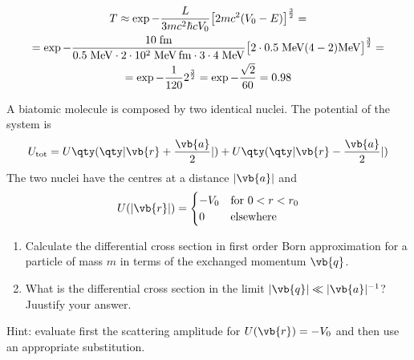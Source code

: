\begin{soluzione}
   \begin{gather*}
      T
      \approx \exp{ - \frac{L}{3 mc^2 \hbar c V_0} \bigl[ 2 mc^2 (V_0 - E) \bigr]^{\frac{3}{2}} }
      =\\
      =\rm \exp{ - \frac{10 \; fm}{0.5 \; MeV \cdot 2 \cdot 10^2 \; MeV \, fm \cdot 3 \cdot 4 \; MeV} \bigl[ 2 \cdot 0.5 \; MeV (4 - 2) MeV \bigr]^{\frac{3}{2}} }
      =\\
      =\exp{ -\frac{1}{120} 2^{\frac{3}{2}} }
      =\exp{-\frac{\sqrt{2}}{60}}
      =0.98
   \end{gather*}
\end{soluzione}

\newpage
\setcounter{equation}{0}

\begin{esercizio}
   A biatomic molecule is composed by two identical nuclei. The potential of the system is
   \begin{equation*}
      U_{\rm tot}=U\qty( \qty| \vb{r} + \frac{\vb{a}}{2} | ) + U\qty( \qty| \vb{r} - \frac{\vb{a}}{2} | )
   \end{equation*}
   The two nuclei have the centres at a distance $|\vb{a}|$ and
   \begin{equation*}
      U(|\vb{r}|)=
      \begin{cases}
         -V_0 & \text{for } 0<r<r_0\\
         0 & \text{elsewhere}
      \end{cases}
   \end{equation*}
   \begin{enumerate}[label=\alph*), leftmargin=0.6cm]
      \item Calculate the differential cross section in first order Born approximation for a particle of mass $m$ in terms of the exchanged momentum $\vb{q}$.
      \item What is the differential cross section in the limit $|\vb{q}| \ll |\vb{a}|^{-1}$? Juustify your answer.
   \end{enumerate}
   Hint: evaluate first the scattering amplitude for $U(\vb{r})=-V_0$ and then use an appropriate substitution.
\end{esercizio}
